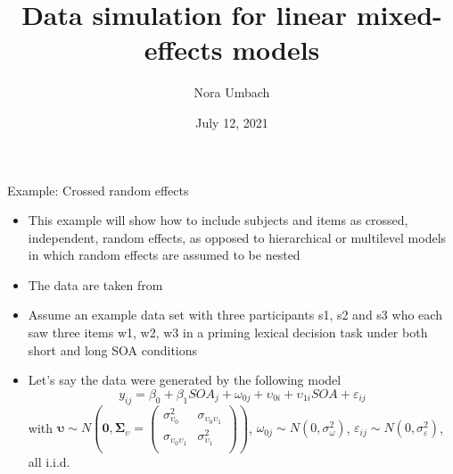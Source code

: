 \documentclass{beamer}
\title{Data simulation for linear mixed-effects models}
\author{Nora Umbach%
}
\date{July 12, 2021}
\newcommand{\gvect}[1]{\boldsymbol{#1}}
\newcommand{\gmat}[1]{\boldsymbol{#1}}
\begin{document}
\begin{frame}{}
\thispagestyle{empty}
\titlepage
\end{frame}



\begin{frame}{Example: Crossed random effects}
  \begin{itemize}
    \item This example will show how to include subjects and items as
      crossed, independent, random effects, as opposed to hierarchical or
      multilevel models in which random effects are assumed to be nested
    \item The data are taken from \citet{Baayen2008}
    \item Assume an example data set with three participants s1, s2 and s3
      who each saw three items w1, w2, w3 in a priming lexical decision
      task under both short and long SOA conditions
    \item Let's say the data were generated by the following model
  \[
    y_{ij} = \beta_0 + \beta_1 SOA_j + \omega_{0j} + \upsilon_{0i} +
      \upsilon_{1i} SOA + \varepsilon_{ij} 
  \]
\small
with $\gvect{\upsilon} \sim N\left(\gvect{0}, \gmat{\Sigma}_{\upsilon} = 
    \begin{pmatrix}
      \sigma^2_{\upsilon_0} & \sigma_{\upsilon_0\upsilon_1} \\
      \sigma_{\upsilon_0\upsilon_1} & \sigma^2_{\upsilon_1} \\
    \end{pmatrix}\right)$,
      $\omega_{0j} \sim N(0, \sigma_{\omega}^2)$, $\varepsilon_{ij} \sim N(0,
  \sigma_{\varepsilon}^2)$, all i.i.d. 
  \end{itemize}
\end{frame}
\end{document}
